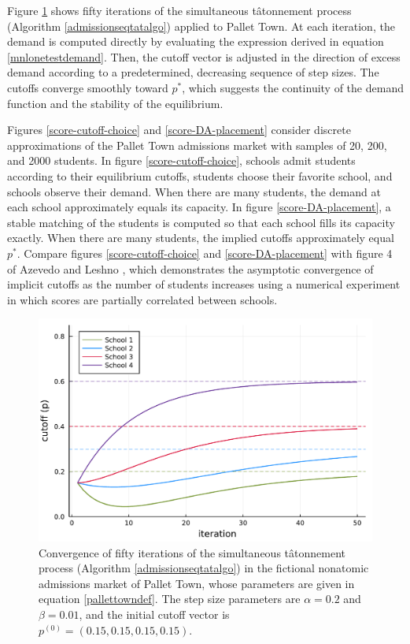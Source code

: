 \documentclass[12pt]{article}
\theoremstyle{definition}
\begin{document}
Figure \ref{tat-iter-cutoff} shows fifty iterations of the simultaneous t\^{a}tonnement process (Algorithm \ref{admissionseqtatalgo}) applied to Pallet Town. At each iteration, the demand is computed directly by evaluating the expression derived in equation \eqref{mnlonetestdemand}. Then, the cutoff vector is adjusted in the direction of excess demand according to a predetermined, decreasing sequence of step sizes. The cutoffs converge smoothly toward $p^*$, which suggests the continuity of the demand function and the stability of the equilibrium. 

Figures \ref{score-cutoff-choice} and \ref{score-DA-placement} consider discrete approximations of the Pallet Town admissions market with samples of 20, 200, and 2000 students. In figure \ref{score-cutoff-choice}, schools admit students according to their equilibrium cutoffs, students choose their favorite school, and schools observe their demand. When there are many students, the demand at each school approximately equals its capacity. In figure \ref{score-DA-placement}, a stable matching of the students is computed so that each school fills its capacity exactly. When there are many students, the implied cutoffs approximately equal $p^*$. Compare figures \ref{score-cutoff-choice} and \ref{score-DA-placement} with figure 4 of Azevedo and Leshno \parencite*{supplydemandfw}, which demonstrates the asymptotic convergence of implicit cutoffs as the number of students increases using a numerical experiment in which scores are partially correlated between schools. 

\begin{figure}
\begin{center}\includegraphics[width=\linewidth, ]{plots/tat-iter-cutoff.pdf}\end{center}
\captionsetup{singlelinecheck=off}
    \caption[.]{Convergence of fifty iterations of the simultaneous t\^{a}tonnement process (Algorithm \ref{admissionseqtatalgo}) in the fictional nonatomic admissions market of Pallet Town, whose parameters are given in equation \eqref{pallettowndef}. The step size parameters are $\alpha = 0.2$ and $\beta = 0.01$, and the initial cutoff vector is $p^{(0)} = (0.15, 0.15, 0.15, 0.15)$. }
\label{tat-iter-cutoff}
\end{figure}
\end{document}
